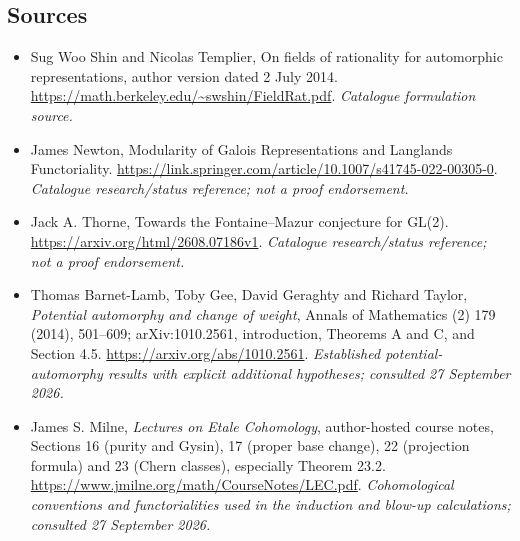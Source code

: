 \documentclass[11pt,a4paper]{article}
\numberwithin{equation}{section}
\begin{document}
\subsection{Sources}
\begin{itemize}\raggedright
\item[\textnormal{[S1]}]\hypertarget{source:statement:1}{} Sug Woo Shin and Nicolas Templier, On fields of rationality for automorphic representations, author version dated 2 July 2014.
\url{https://math.berkeley.edu/~swshin/FieldRat.pdf}.
{\small\textit{Catalogue formulation source.}}
\item[\textnormal{[S2]}]\hypertarget{source:statement:2}{} James Newton, Modularity of Galois Representations and Langlands Functoriality.
\url{https://link.springer.com/article/10.1007/s41745-022-00305-0}.
{\small\textit{Catalogue research/status reference; not a proof endorsement.}}
\item[\textnormal{[S3]}]\hypertarget{source:statement:3}{} Jack A. Thorne, Towards the Fontaine–Mazur conjecture for GL(2).
\url{https://arxiv.org/html/2608.07186v1}.
{\small\textit{Catalogue research/status reference; not a proof endorsement.}}
\item[\textnormal{[E1]}]\hypertarget{extra:statement:1}{} Thomas Barnet-Lamb,
Toby Gee, David Geraghty and Richard Taylor, \emph{Potential automorphy and
change of weight}, Annals of Mathematics (2) 179 (2014), 501--609;
arXiv:1010.2561, introduction, Theorems A and C, and Section 4.5.
\url{https://arxiv.org/abs/1010.2561}.
{\small\textit{Established potential-automorphy results with explicit
additional hypotheses; consulted 27 September 2026.}}
\item[\textnormal{[E2]}]\hypertarget{extra:statement:2}{} James S. Milne,
\emph{Lectures on Etale Cohomology}, author-hosted course notes,
Sections 16 (purity and Gysin), 17 (proper base change), 22 (projection
formula) and 23 (Chern classes), especially Theorem 23.2.
\url{https://www.jmilne.org/math/CourseNotes/LEC.pdf}.
{\small\textit{Cohomological conventions and functorialities used in the
induction and blow-up calculations; consulted 27 September 2026.}}
\end{itemize}
\end{document}
